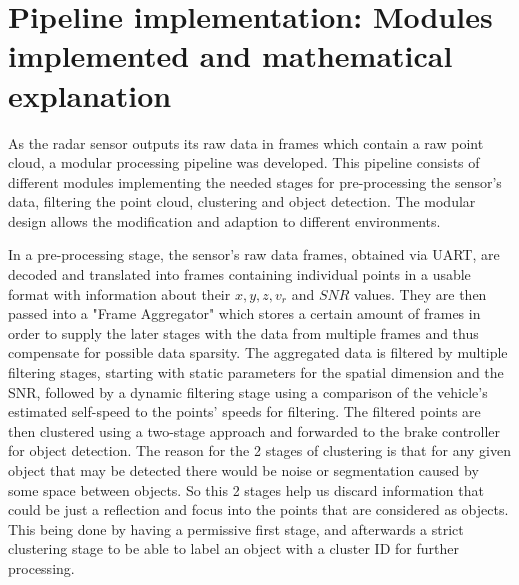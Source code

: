 
\section{Pipeline implementation: Modules implemented and mathematical explanation}
\label{sec:Mathematical Models and Algorithms for Radar-Based Object Detection}
As the radar sensor outputs its raw data in frames which contain a raw point cloud, a modular processing pipeline was developed.
This pipeline consists of different modules implementing the needed stages for pre-processing the sensor's data, filtering the point cloud, clustering and object detection.
The modular design allows the modification and adaption to different environments.
\par
In a pre-processing stage, the sensor's raw data frames, obtained via UART, are decoded and translated into frames containing individual points in a usable format with information about their $x,y,z,v_{r}$ and $SNR$ values.
They are then passed into a "Frame Aggregator" which stores a certain amount of frames in order to supply the later stages with the data from multiple frames and thus compensate for possible data sparsity.
The aggregated data is filtered by multiple filtering stages, starting with static parameters for the spatial dimension and the SNR, followed by a dynamic filtering stage using a comparison of the vehicle's estimated self-speed to the points' speeds for filtering.
The filtered points are then clustered using a two-stage approach and forwarded to the brake controller for object detection. The reason for the 2 stages of clustering is that for any given object that may be detected there would be noise or segmentation caused by some space between objects. So this 2 stages help us discard information that could be just a reflection and focus into the points that are considered as objects. This being done by having a permissive first stage, and afterwards a strict clustering stage to be able to label an object with a cluster ID for further processing.
